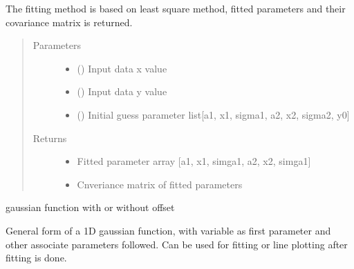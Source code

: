 \documentclass[letterpaper,10pt,english]{sphinxmanual}
\begin{document}
\begin{fulllineitems}
\begin{fulllineitems}
The fitting method is based on  least square method, fitted
parameters and their covariance matrix is returned.
\begin{quote}\begin{description}
\item[{Parameters}] \leavevmode\begin{itemize}
\item {} 
 () \textendash{} Input data x value

\item {} 
 () \textendash{} Input data y value

\item {} 
 () \textendash{} Initial guess parameter list{[}a1, x1, sigma1, a2, x2, sigma2, y0{]}

\end{itemize}

\item[{Returns}] \leavevmode
\begin{itemize}
\item {} 
 \textendash{} Fitted parameter array {[}a1, x1, simga1, a2, x2, simga1{]}

\item {} 
 \textendash{} Cnveriance matrix of fitted parameters

\end{itemize}


\end{description}\end{quote}

\end{fulllineitems}


\begin{fulllineitems}
\label{\detokenize{scibeam.core:scibeam.core.gaussian.Gaussian.gaus}}
gaussian function with or without offset

General form of a 1D gaussian function, with variable as first
parameter and other associate parameters followed. Can be used
for fitting or line plotting after fitting is done.


\end{fulllineitems}
\end{fulllineitems}
\end{document}
